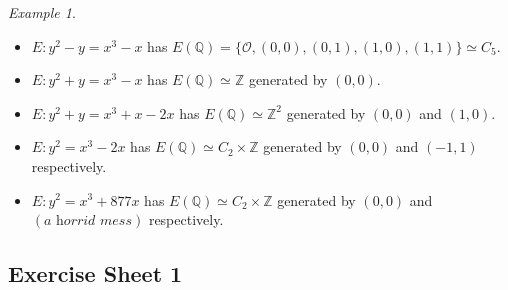 \documentclass[a4paper]{article}
\theoremstyle{plain}
\theoremstyle{remark}
\newtheorem*{example}{Example}
\theoremstyle{definition}
\renewcommand{\O}{\mathcal{O}}
\newcommand{\Z}{\mathbb{Z}}
\newcommand{\Q}{\mathbb{Q}}
\begin{document}
\begin{example}
    ~
    \begin{itemize}
        \item $E:y^2-y=x^3-x$ has
            $E(\Q)=\{\O,(0,0),(0,1),(1,0),(1,1)\}\simeq C_5$.

        \item $E:y^2+y=x^3-x$ has $E(\Q)\simeq\Z$ generated by $(0,0)$.

        \item $E:y^2+y=x^3+x-2x$ has $E(\Q)\simeq\Z^2$ generated by $(0,0)$ and
            $(1,0)$.

        \item $E:y^2=x^3-2x$ has $E(\Q)\simeq C_2\times\Z$ generated by $(0,0)$
            and $(-1,1)$ respectively.

        \item $E:y^2=x^3+877x$ has $E(\Q)\simeq C_2\times\Z$ generated by $(0,0)$
            and $(\textit{a horrid mess})$ respectively.
    \end{itemize}
\end{example}

\subsection*{Exercise Sheet 1}
\end{document}
